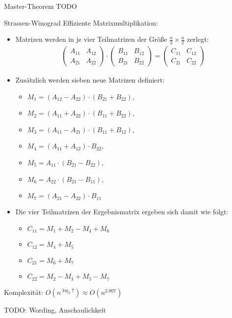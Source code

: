 \begin{bonus}{Master-Theorem}
    TODO
\end{bonus}

\begin{example}[Komplexität]{Strassen-Winograd}
    Effiziente Matrixmultiplikation:
    \begin{itemize}
        \item Matrizen werden in je vier Teilmatrizen der Größe $\frac{n}{2} \times \frac{n}{2}$ zerlegt:
              \begin{align}
                  \begin{pmatrix}
                      A_{11} & A_{12} \\
                      A_{21} & A_{22}
                  \end{pmatrix}
                  \cdot
                  \begin{pmatrix}
                      B_{11} & B_{12} \\
                      B_{21} & B_{22}
                  \end{pmatrix}
                  =
                  \begin{pmatrix}
                      C_{11} & C_{12} \\
                      C_{21} & C_{22}
                  \end{pmatrix}
              \end{align}
        \item Zusätzlich werden sieben neue Matrizen definiert:
              \begin{itemize}
                  \item $M_1 = (A_{12} - A_{22})\cdot(B_{21} + B_{22})$,
                  \item $M_2 = (A_{11} + A_{22})\cdot(B_{11} + B_{22})$,
                  \item $M_3 = (A_{11} - A_{21})\cdot(B_{11} + B_{12})$,
                  \item $M_4 = (A_{11} + A_{12})\cdot B_{22}$,
                  \item $M_5 = A_{11}\cdot(B_{21} - B_{22})$,
                  \item $M_6 = A_{22}\cdot(B_{21} - B_{11})$,
                  \item $M_7 = (A_{21} - A_{22})\cdot B_{11}$
              \end{itemize}
        \item Die vier Teilmatrizen der Ergebnismatrix ergeben sich damit wie folgt:
              \begin{itemize}
                  \item $C_{11} = M_1 + M_2 - M_4 + M_6$
                  \item $C_{12} = M_4 + M_5$
                  \item $C_{21} = M_6 + M_7$
                  \item $C_{22} = M_2 - M_3 + M_5 - M_7$
              \end{itemize}
    \end{itemize}
    Komplexität: $O(n^{\log_2 7})\approx O(n^2.807)$

    TODO: Wording, Anschaulichkeit
\end{example}



